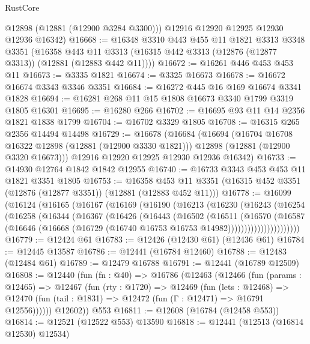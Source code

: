 \begin{lexlean}{RustCore}
\begin{coremodule}
        @12898
        (@12881 (@12900 @3284 @3300)))
      @12916
      @12920
      @12925
      @12930
      @12936
      @16342)
@16668 := @16348
    @3310
    @443
    @455
    @11
    @1821
    @3313
    @3348
    @3351
    (@16358 @443 @11 @3313 (@16315 @442 @3313 (@12876 (@12877 @3313)) (@12881 (@12883 @442 @11))))
@16672 := @16261 @446 @453 @453 @11
@16673 := @3335 @1821
@16674 := @3325 @16673
@16678 := @16672 @16674 @3343 @3346 @3351
@16684 := @16272 @445 @16 @169 @16674 @3341 @1828
@16694 := @16281 @268 @11 @15 @1808 @16673 @3340 @1799 @3319 @1805 @16301
@16695 := @16280 @266
@16702 := @16695 @93 @11 @14 @2356 @1821 @1838 @1799
@16704 := @16702 @3329 @1805
@16708 := @16315 @265 @2356 @14494 @14498
@16729 := @16678
    (@16684
      (@16694
        (@16704 @16708 @16322 @12898 (@12881 (@12900 @3330 @1821)))
        @12898
        (@12881 (@12900 @3320 @16673)))
      @12916
      @12920
      @12925
      @12930
      @12936
      @16342)
@16733 := @14930 @12764 @1842 @1842 @12955
@16740 := @16733 @3343 @453 @453 @11 @1821 @3351 @1805
@16753 := @16358
    @453
    @11
    @3351
    (@16315 @452 @3351 (@12876 (@12877 @3351)) (@12881 (@12883 @452 @11)))
@16778 := @16099
    (@16124
      (@16165
        (@16167
          (@16169
            (@16190
              (@16213
                (@16230
                  (@16243
                    (@16254
                      (@16258
                        (@16344
                          (@16367
                            (@16426
                              (@16443
                                (@16502
                                  (@16511
                                    (@16570
                                      (@16587
                                        (@16646
                                          (@16668
                                            (@16729
                                              (@16740 @16753 @16753 @14982))))))))))))))))))))))
@16779 := @12424 @61
@16783 := @12426 (@12430 @61) (@12436 @61)
@16784 := @12445 @13587
@16786 := @12441 (@16784 @12460)
@16788 := @12483 (@12484 @61)
@16789 := @12479 @16788
@16791 := @12441 (@16789 @12509)
@16808 := @12440
    (fun (fn : @40) =>
    @16786
      (@12463
        (@12466
          (fun (params : @12465) =>
          @12467
            (fun (rty : @1720) =>
            @12469
              (fun (lets : @12468) =>
              @12470 (fun (tail : @1831) => @12472 (fun (Γ : @12471) => @16791 @12556))))))
        @12602))
    @553
@16811 := @12608 (@16784 (@12458 @553))
@16814 := @12521 (@12522 @553) @13590
@16818 := @12441 (@12513 (@16814 @12530) @12534)

\end{coremodule}
\end{lexlean}
